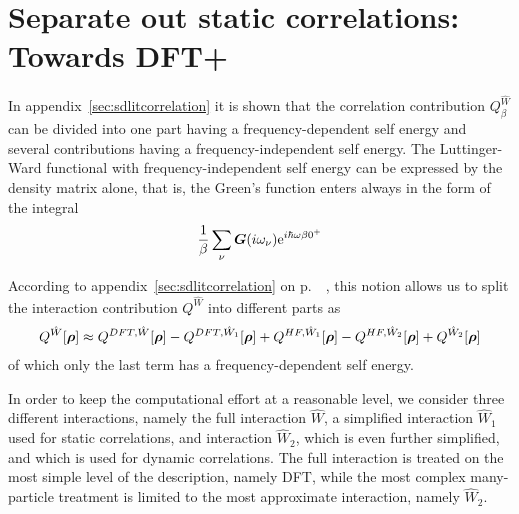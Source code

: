 \documentclass[11pt,a4paper]{report}
\begin{document}
\section{Separate out static correlations: Towards DFT+}
In appendix~\ref{sec:sdlitcorrelation} it is shown that the
correlation contribution $Q^{\hat{W}}_\beta$ can be divided into
one part having a frequency-dependent self energy and several
contributions having a frequency-independent self energy. The
Luttinger-Ward functional with frequency-independent self energy can
be expressed by the density matrix alone, that is, the Green's function
enters always in the form of the integral
\begin{eqnarray}
\frac{1}{\beta}\sum_\nu\bm{G}(i\omega_\nu)\mathrm{e}^{i\hbar\omega\beta0^+}
\end{eqnarray}

According to appendix~\ref{sec:sdlitcorrelation} on
p.~~\pageref{sec:sdlitcorrelation}, this notion allows us to split the
interaction contribution $Q^{\hat{W}}$ into different parts as
\begin{eqnarray}
Q^{\hat{W}}[\bm{\rho}]
\approx Q^{DFT,\hat{W}}[\bm{\rho}]-Q^{DFT,\hat{W}_1}[\bm{\rho}]
+Q^{HF,\hat{W}_1}[\bm{\rho}]-Q^{HF,\hat{W}_2}[\bm{\rho}]
+Q^{\hat{W}_2}[\bm{\rho}]
\label{eq:splitq}
\end{eqnarray}
of which only the last term has a frequency-dependent self energy.

In order to keep the computational effort at a reasonable level, we
consider three different interactions, namely the full interaction
$\hat{W}$, a simplified interaction $\hat{W}_1$ used for static
correlations, and interaction $\hat{W}_2$, which is even further
simplified, and which is used for dynamic correlations.
The full interaction is treated on the most simple level of the
description, namely DFT, while the most complex many-particle
treatment is limited to the most approximate interaction, namely
$\hat{W}_2$. 
\end{document}

